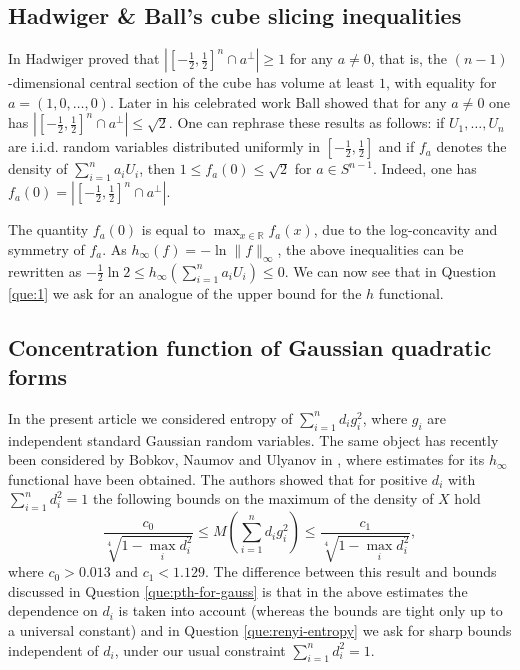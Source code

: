 \documentclass[11pt]{amsart}
\newcommand{\1}{\mathbf{1}}
\newcommand{\R}{\mathbb{R}}
\theoremstyle{definition}
\theoremstyle{definition}
\theoremstyle{remark}
\begin{document}
\subsection{Hadwiger \& Ball's cube slicing inequalities} In \cite{H72} Hadwiger proved that $|[-\frac12, \frac12]^n \cap a^{\perp}| \geq 1$ for any $a \ne 0$, that is, the $(n-1)$-dimensional central section of the cube has volume at least $1$, with equality for $a=(1,0,\ldots,0)$. Later in his celebrated work \cite{B86-ball} Ball showed that for any $a \ne 0$ one has $|[-\frac12, \frac12]^n \cap a^{\perp}| \leq \sqrt{2}$. One can rephrase these results as follows: if $U_1,\ldots, U_n$ are i.i.d. random variables distributed uniformly in $[-\frac12,\frac12]$ and if $f_a$ denotes the density of $\sum_{i=1}^n a_i U_i$, then  $1 \leq f_a(0)\leq \sqrt{2}$ for $a \in S^{n-1}$. Indeed, one has $f_a(0)=|[-\frac12, \frac12]^n \cap a^{\perp}|$. 



The quantity $f_a(0)$ is equal to $\max_{x \in \R} f_a(x)$, due to the log-concavity and symmetry of $f_a$. As $h_\infty(f) = -\ln \|f\|_\infty$, the above inequalities can be rewritten as $-\frac12\ln 2 \leq h_\infty(\sum_{i=1}^n a_i U_i) \leq 0$. We can now see that in Question \ref{que:1} we ask for an analogue of the upper bound for the $h$ functional.          

\subsection{Concentration function of Gaussian quadratic forms}

In the present article we considered entropy of $\sum_{i=1}^n d_i g_i^2$, where $g_i$ are independent standard Gaussian random variables. The same object has recently been considered by Bobkov, Naumov and Ulyanov in \cite{BNU20}, where estimates for its $h_\infty$ functional have been obtained. The authors showed that for positive $d_i$ with $\sum_{i=1}^n d_i^2 =1$ the following bounds on the maximum of the density of $X$ hold
\[
	\frac{c_0}{\sqrt[4]{1-\max_{i} d_i^2}} \leq M\left( \sum_{i=1}^n d_i g_i^2 \right) \leq \frac{c_1}{\sqrt[4]{1-\max_{i} d_i^2}},
\]  
where $c_0>0.013$ and $c_1<1.129$. The difference between this result and bounds discussed in Question \ref{que:pth-for-gauss} is that in the above estimates the dependence on $d_i$ is taken into account (whereas the bounds are tight only up to a universal constant) and in Question \ref{que:renyi-entropy} we ask for  sharp bounds independent of $d_i$, under our usual constraint $\sum_{i=1}^n d_i^2=1$.    
\end{document}

